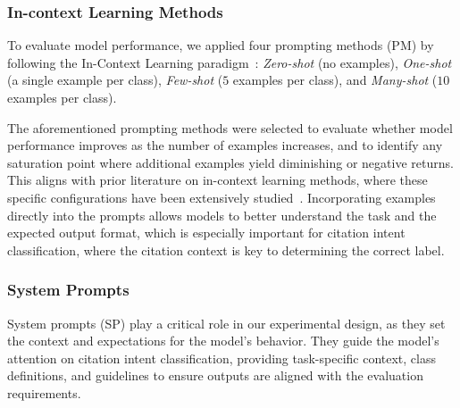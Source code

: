 \subsubsection{In-context Learning Methods}\label{sec:in_context_learning}
To evaluate model performance, we applied four prompting methods (PM) by following the In-Context Learning paradigm~\citep{BMR2020}:
\textit{Zero-shot} (no examples),
\textit{One-shot} (a single example per class),
\textit{Few-shot} ($5$ examples per class), and
\textit{Many-shot} ($10$ examples per class).

The aforementioned prompting methods were selected to evaluate whether model performance improves as the number of examples increases, and to identify any saturation point where additional examples yield diminishing or negative returns. 
This aligns with prior literature on in-context learning methods, where these specific configurations have been extensively studied~\citep{icl-survey}.
Incorporating examples directly into the prompts allows models to better understand the task and the expected output format, which is especially important for citation intent classification, where the citation context is key to determining the correct label.




\subsubsection{System Prompts}\label{sec:system_prompts}
System prompts (SP) play a critical role in our experimental design, as they set the context and expectations for the model's behavior. 
They guide the model's attention on citation intent classification, providing task-specific context, 
class definitions, and guidelines to ensure outputs are aligned with the evaluation requirements.


